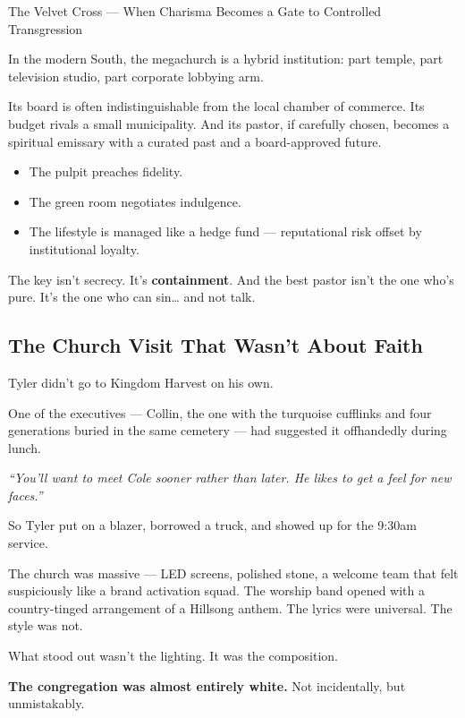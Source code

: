 \begin{HistoricalSidebar}{The Velvet Cross — When Charisma Becomes a Gate to Controlled Transgression}

In the modern South, the megachurch is a hybrid institution: part temple, part television studio, part corporate lobbying arm.  

Its board is often indistinguishable from the local chamber of commerce. Its budget rivals a small municipality.  
And its pastor, if carefully chosen, becomes a spiritual emissary with a curated past and a board-approved future.

\begin{itemize}
  \item The pulpit preaches fidelity.  
  \item The green room negotiates indulgence.  
  \item The lifestyle is managed like a hedge fund — reputational risk offset by institutional loyalty.
\end{itemize}

The key isn’t secrecy. It’s \textbf{containment}.  
And the best pastor isn’t the one who’s pure.  
It’s the one who can sin… and not talk.

\end{HistoricalSidebar}

\subsection{The Church Visit That Wasn’t About Faith}

Tyler didn’t go to Kingdom Harvest on his own.

One of the executives — Collin, the one with the turquoise cufflinks and four generations buried in the same cemetery — had suggested it offhandedly during lunch.

\textit{“You’ll want to meet Cole sooner rather than later. He likes to get a feel for new faces.”}

So Tyler put on a blazer, borrowed a truck, and showed up for the 9:30am service.

The church was massive — LED screens, polished stone, a welcome team that felt suspiciously like a brand activation squad.  
The worship band opened with a country-tinged arrangement of a Hillsong anthem. The lyrics were universal. The style was not.

What stood out wasn’t the lighting.  
It was the composition.

\textbf{The congregation was almost entirely white.}  
Not incidentally, but unmistakably.


